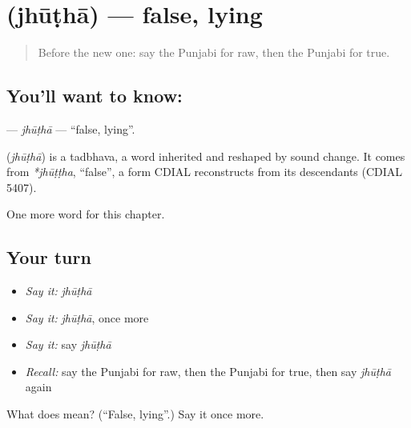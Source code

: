 \section[\texorpdfstring{\pa{ਝੂਠਾ} (jhūṭhā)}{ਝੂਠਾ (jhūṭhā)}]{ (jhūṭhā) — false, lying}

\label{lesson:PA-C146-jhutha}



\begin{quote}
Before the new one: say the Punjabi for raw, then the Punjabi for true.
\end{quote}

\subsection*{You'll want to know: }
\textbf{} — \emph{jhūṭhā} — \textquotedblleft{}false, lying\textquotedblright{}.

\begin{cousinweb}
\textbf{} (\emph{jhūṭhā}) is a tadbhava, a word inherited and reshaped by sound change. It comes from \emph{*jhūṭṭha}, \textquotedblleft{}false\textquotedblright{}, a form CDIAL reconstructs from its descendants (CDIAL 5407).
\end{cousinweb}

\begin{grammarlens}[title={What you've built}]
One more word for this chapter.
\end{grammarlens}

\subsection*{Your turn}
\begin{itemize}
\raggedright
  \item \emph{Say it:} \emph{jhūṭhā}
  \item \emph{Say it:} \emph{jhūṭhā}, once more
  \item \emph{Say it:} say \emph{jhūṭhā}
  \item \emph{Recall:} say the Punjabi for raw, then the Punjabi for true, then say \emph{jhūṭhā} again
\end{itemize}

\begin{tcolorbox}[breakable,colback=teal!4,colframe=teal!35!black,title={Before you move on}]
What does  mean? (\textquotedblleft{}False, lying\textquotedblright{}.) Say it once more.
\end{tcolorbox}
